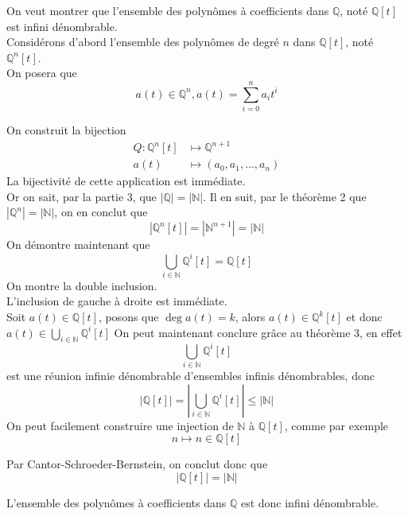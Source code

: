 \documentclass[11pt, a4paper, twoside]{article}
\begin{document}
On veut montrer que l'ensemble des polynômes à coefficients dans $\mathbb{Q}$, noté $\mathbb{Q}[t]$ est infini dénombrable.\\
Considérons d'abord l'ensemble des polynômes de degré $n$ dans $\mathbb{Q}[t]$, noté $\mathbb{Q}^{n}[t]$.\\
On posera que 
\[ 
	a(t) \in \mathbb{Q}^{n}, a(t) = \sum_{i=0}^{ n} a_i t^{i}
\]

On construit la bijection
\begin{align*}
Q:	\mathbb{Q}^{n}[t] &\mapsto \mathbb{Q}^{n+1}\\
	a(t) &\mapsto (a_0,a_1,\ldots, a_n)
\end{align*}
La bijectivité de cette application est immédiate.\\
Or on sait, par la partie 3, que $|\mathbb{Q}| = |\mathbb{N}|$. Il en suit, par le théorème 2 que $|\mathbb{Q}^{n}| = |\mathbb{N}|$, on en conclut que
\[ 
	|\mathbb{Q}^{n}[t] | = |\mathbb{N}^{n+1}| = |\mathbb{N}|
\]
On démontre maintenant que
\[ 
	\bigcup_{i \in \mathbb{N}} \mathbb{Q}^{i}[t]	= \mathbb{Q}[t]	
\]
On montre la double inclusion.\\
L'inclusion de gauche à droite est immédiate.\\
Soit $a(t) \in \mathbb{Q}[t]$, posons que $\deg a(t) = k$, alors $a(t) \in \mathbb{Q}^{k}[t]$ et donc
$a(t) \in \bigcup_{i \in \mathbb{N}} \mathbb{Q}^{i}[t]$
On peut maintenant conclure grâce au théorème 3, en effet
\[ 
\bigcup_{i \in \mathbb{N}} \mathbb{Q}^{i}[t]
\]
est une réunion infinie dénombrable d'ensembles infinis dénombrables, donc
\[ 
	|\mathbb{Q}[t]|=|\bigcup_{i \in \mathbb{N}} \mathbb{Q}^{i}[t]| \leq |\mathbb{N}|
\]
On peut facilement construire une injection de $\mathbb{N}$ à $\mathbb{Q}[t]$, comme par exemple
\[ 
	n \mapsto n \in \mathbb{Q}[t]
\]

Par Cantor-Schroeder-Bernstein, on conclut donc que
\[ 
	|\mathbb{Q}[t]| = |\mathbb{N}|
\]

L'ensemble des polynômes à coefficients dans $\mathbb{Q}$ est donc infini dénombrable.
\end{document}
